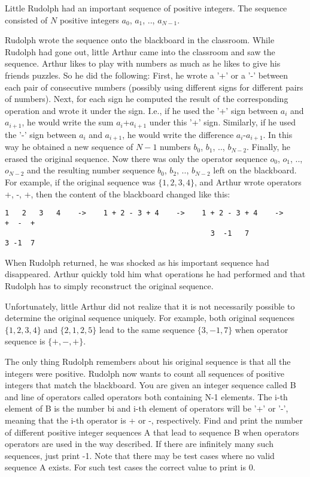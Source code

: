 Little Rudolph had an important sequence of positive integers. The sequence consisted of $N$ positive integers $a_0$, $a_1$, .., $a_{N-1}$. 

Rudolph wrote the sequence onto the blackboard in the classroom. While Rudolph had gone out, little Arthur came into the classroom and saw the sequence. Arthur likes to play with numbers as much as he likes to give his friends puzzles. So he did the following:
First, he wrote a '+' or a '-' between each pair of consecutive numbers (possibly using different signs for different pairs of numbers).
Next, for each sign he computed the result of the corresponding operation and wrote it under the sign. I.e., if he used the '+' sign between $a_i$ and $a_{i+1}$, he would write the sum $a_i$+$a_{i+1}$ under this '+' sign. Similarly, if he used the '-' sign between $a_i$ and $a_{i+1}$, he would write the difference $a_i$-$a_{i+1}$. In this way he obtained a new sequence of $N-1$ numbers $b_0$, $b_1$, .., $b_{N-2}$.
Finally, he erased the original sequence. Now there was only the operator sequence $o_0$, $o_1$, .., $o_{N-2}$ and the resulting number sequence $b_0$, $b_2$, .., $b_{N-2}$ left on the blackboard.
For example, if the original sequence was $\{1, 2, 3, 4\}$, and Arthur wrote operators {+, -, +}, then the content of the blackboard changed like this: 

\begin{verbatim}
1   2   3   4    ->    1 + 2 - 3 + 4    ->    1 + 2 - 3 + 4    ->     +  -  +
                                                3  -1   7             3 -1  7
\end{verbatim}

When Rudolph returned, he was shocked as his important sequence had disappeared. Arthur quickly told him what operations he had performed and that Rudolph has to simply reconstruct the original sequence. 

Unfortunately, little Arthur did not realize that it is not necessarily possible to determine the original sequence uniquely. For example, both original sequences $\{1, 2, 3, 4\}$ and $\{2, 1, 2, 5\}$ lead to the same sequence $\{3, -1, 7\}$ when operator sequence is $\{+, -, +\}$.

The only thing Rudolph remembers about his original sequence is that all the integers were positive. Rudolph now wants to count all sequences of positive integers that match the blackboard. You are given an integer sequence called B and line of operators called operators both containing N-1 elements. The i-th element of B is the number bi and i-th element of operators will be '+' or '-', meaning that the i-th operator is + or -, respectively. Find and print the number of different positive integer sequences A that lead to sequence B when operators operators are used in the way described. If there are infinitely many such sequences, just print -1. Note that there may be test cases where no valid sequence A exists. For such test cases the correct value to print is 0.


